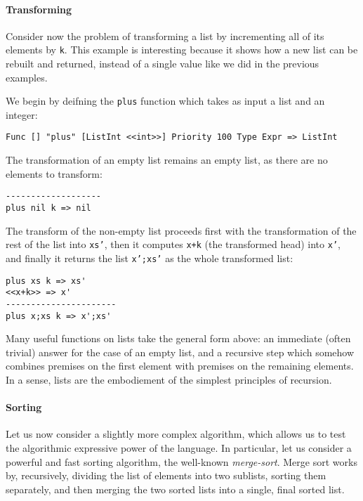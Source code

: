 \paragraph{Transforming}
Consider now the problem of transforming a list by incrementing all of its elements by \texttt{k}. This example is interesting because it shows how a new list can be rebuilt and returned, instead of a single value like we did in the previous examples. 

We begin by deifning the \texttt{plus} function which takes as input a list and an integer:

\begin{lstlisting}
Func [] "plus" [ListInt <<int>>] Priority 100 Type Expr => ListInt
\end{lstlisting}

The transformation of an empty list remains an empty list, as there are no elements to transform:

\begin{lstlisting}
-------------------
plus nil k => nil
\end{lstlisting}

The transform of the non-empty list proceeds first with the transformation of the rest of the list into \texttt{xs'}, then it computes \texttt{x+k} (the transformed head) into \texttt{x'}, and finally it returns the list \texttt{x';xs'} as the whole transformed list:

\begin{lstlisting}
plus xs k => xs'
<<x+k>> => x'
----------------------
plus x;xs k => x';xs'
\end{lstlisting}


Many useful functions on lists take the general form above: an immediate (often trivial) answer for the case of an empty list, and a recursive step which somehow combines premises on the first element with premises on the remaining elements. In a sense, lists are the embodiement of the simplest principles of recursion.


\paragraph{Sorting}
Let us now consider a slightly more complex algorithm, which allows us to test the algorithmic expressive power of the language. In particular, let us consider a powerful and fast sorting algorithm, the well-known \textit{merge-sort}. Merge sort works by, recursively, dividing the list of elements into two sublists, sorting them separately, and then merging the two sorted lists into a single, final sorted list.

